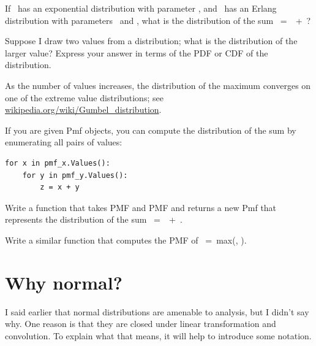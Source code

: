 \documentclass[12pt]{book}
\begin{document}
\begin{exercise}
If \X~has an exponential distribution with parameter
\mylambda, and \Y~has an Erlang distribution with parameters
\kk~and \mylambda, what is the distribution of the sum \Z~=~\X~+~\Y?

\end{exercise}

\begin{exercise}
Suppose I draw two values from a distribution; what is the distribution
of the larger value?  Express your answer in terms of the PDF or CDF of
the distribution.

As the number of values increases, the distribution of the maximum
converges on one of the extreme value distributions; see
\url{wikipedia.org/wiki/Gumbel_distribution}.

\end{exercise}

\begin{exercise}
If you are given Pmf objects, you can compute the distribution of
the sum by enumerating all pairs of values:
%
\begin{verbatim}
for x in pmf_x.Values():
    for y in pmf_y.Values():
        z = x + y
\end{verbatim}

Write a function that takes PMF and
PMF and returns a new Pmf that represents the distribution of
the sum \Z~=~\X~+~\Y.

Write a similar function that computes the PMF of \Z~=~max(\X, \Y).

\end{exercise}



\section{Why normal?}
\label{why_normal}

I said earlier that normal distributions are amenable to analysis,
but I didn't say why.  One reason is that they are
closed under linear transformation and convolution.  To explain what
that means, it will help to introduce some notation.
\end{document}
